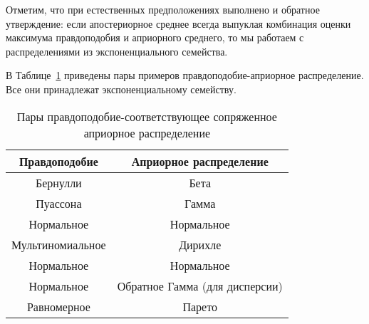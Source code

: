 Отметим, что при естественных предположениях выполнено и обратное утверждение:
если апостериорное среднее всегда выпуклая комбинация оценки максимума правдоподобия и априорного среднего,
то мы работаем с распределениями из экспоненциального семейства.

В Таблице~\ref{table:conjugate} приведены пары примеров правдоподобие-априорное распределение.
Все они принадлежат экспоненциальному семейству.

\begin{table}[h]
\centering
\begin{tabular}{cc}
\hline
Правдоподобие & Априорное распределение \\
\hline
Бернулли & Бета \\
Пуассона & Гамма \\
Нормальное & Нормальное \\
Мультиномиальное & Дирихле \\
Нормальное & Нормальное \\
Нормальное & Обратное Гамма (для дисперсии) \\
Равномерное & Парето \\
\hline
\end{tabular}
\caption{Пары правдоподобие-соответствующее сопряженное априорное распределение}
\label{table:conjugate}
\end{table}






